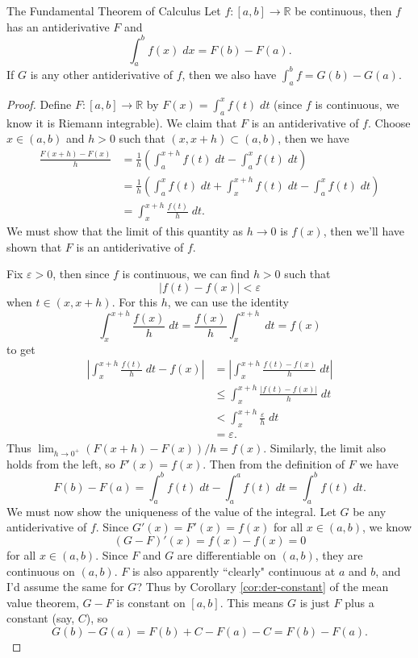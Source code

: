 \documentclass[10pt]{report}
\begin{document}
\begin{thrm}{The Fundamental Theorem of Calculus}{}
	Let $f:[a,b]\to\mathbb{R}$ be continuous, then $f$ has an antiderivative $F$ and
	\[
		\int_{a}^{b} f(x) \;dx = F(b)-F(a).
	\] 
	If $G$ is any other antiderivative of $f$, then we also have $\int_{a}^{b} f = G(b)-G(a)$.
\end{thrm}
\begin{proof}
	Define $F:[a,b] \to \mathbb{R}$ by $F(x) = \int_{a}^{x} f(t) \;dt$ (since $f$ is continuous, we know it is Riemann integrable). We claim that $F$ is an antiderivative of $f$. Choose $x \in (a,b)$ and $h>0$ such that $(x,x+h) \subset (a,b)$, then we have
	\begin{align*}
		\frac{F(x+h)-F(x)}{h} &= \frac{1}{h} \left( \int_{a}^{x+h} f(t)\;dt - \int_{a}^{x} f(t)\;dt \right) \\
				      &= \frac{1}{h} \left( \int_{a}^{x} f(t)\;dt + \int_{x}^{x+h} f(t)\;dt - \int_{a}^{x} f(t)\;dt \right) \\
				      &= \int_{x}^{x+h} \frac{f(t)}{h} \;dt.
	\end{align*}
	We must show that the limit of this quantity as $h\to 0$ is $f(x)$, then we'll have shown that $F$ is an antiderivative of $f$.

	Fix $\varepsilon>0$, then since $f$ is continuous, we can find $h>0$ such that
	\[
		|f(t)-f(x)|<\varepsilon
	\] when $t \in (x, x+h)$. For this $h$, we can use the identity
	 \[
		 \int_{x}^{x+h} \frac{f(x)}{h} \;dt = \frac{f(x)}{h} \int_{x}^{x+h} \;dt =  f(x)
	\] to get
	\begin{align*}
		\left| \int_{x}^{x+h} \frac{f(t)}{h} \;dt -f(x)\right| &= \left| \int_{x}^{x+h} \frac{f(t)-f(x)}{h} \;dt \right| \\
								       &\leq \int_{x}^{x+h} \frac{|f(t)-f(x)|}{h} \;dt \\
								       &< \int_{x}^{x+h} \frac{\varepsilon}{h} \;dt \\
								       &= \varepsilon.
	\end{align*}
	Thus $\lim_{h \to 0^+} (F(x+h) - F(x))/h = f(x)$. Similarly, the limit also holds from the left, so $F'(x) = f(x)$. Then from the definition of $F$ we have
	\[
		F(b) - F(a) = \int_{a}^{b} f(t) \;dt - \int_{a}^{a} f(t)\;dt = \int_{a}^{b} f(t)\;dt.
	\] 
	We must now show the uniqueness of the value of the integral. Let $G$ be any antiderivative of $f$. Since  $G'(x) = F'(x) = f(x)$ for all $x \in (a,b)$, we know
	\[
		(G-F)'(x) = f(x) - f(x) = 0
	\] for all $x \in (a,b)$. Since $F$ and $G$ are differentiable on $(a,b)$, they are continuous on $(a,b)$. {\color{red}$F$ is also apparently ``clearly" continuous at $a$ and $b$, and I'd assume the same for $G$?} Thus by Corollary \ref{cor:der-constant} of the mean value theorem, $G-F$ is constant on $[a,b]$. This means $G$ is just $F$ plus a constant (say, $C$), so
	\[
		G(b)-G(a) = F(b)+C - F(a)-C = F(b)-F(a).
	\] 
\end{proof}
\end{document}
